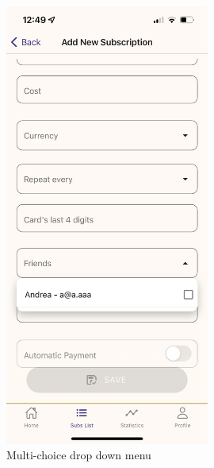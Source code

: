 \documentclass[12pt]{article}
\begin{document}
\begin{figure}[h!]
\begin{minipage}[c]{0.45\textwidth}
        \includegraphics[width=0.6\textwidth, clip]{../../assets/smartphone/addDrop.PNG}
        \caption{Multi-choice drop down menu}
        \label{fig:addDrop}
    \end{minipage}
\end{figure}
\end{document}
